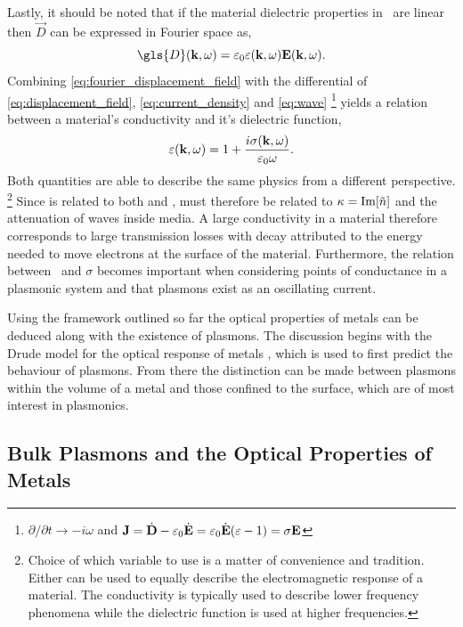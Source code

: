 \documentclass{article}
\begin{document}
Lastly, it should be noted that if the material dielectric properties in \eps\ are linear then $\vec{D}$ can be expressed in Fourier space as,%
\begin{equation}
	\gls{D}(\wv, \omega) = \epsfs\eps(\wv, \omega)\vec{E}(\wv, \omega).
	\label{eq:fourier_displacement_field}
\end{equation}
Combining \eqref{eq:fourier_displacement_field} with the differential of \eqref{eq:displacement_field}, \eqref{eq:current_density} and \eqref{eq:wave}%
\footnote{$\partial/\partial t \rightarrow -i\omega$ and $\mathbf{J}=\dot{\mathbf{D}}-\varepsilon_0\dot{\mathbf{E}}=\varepsilon_0\dot{\mathbf{E}}(\varepsilon-1)=\sigma\mathbf{E}$}
yields a relation between a material's conductivity and it's dielectric function,
\begin{equation}
	\varepsilon(\mathbf{k}, \omega) = 1 + \frac{i\sigma(\mathbf{k}, \omega)}{\varepsilon_0\omega}.
	\label{eq:dielectric_conductivity}
\end{equation}
Both quantities are able to describe the same physics from a different perspective.%
\footnote{Choice of which variable to use is a matter of convenience and tradition. Either can be used to equally describe the electromagnetic response of a material. The conductivity is typically used to describe lower frequency phenomena while the dielectric function is used at higher frequencies.}
Since \real{\eps} is related to both \imag{\sigma} and , \real{\sigma} must therefore be related to $\kappa=\mathrm{Im}\!\left[{\tilde{n}}\right]$ and the attenuation of waves inside media. A large conductivity in a material therefore corresponds to large transmission losses with decay attributed to the energy needed to move electrons at the surface of the material. Furthermore, the relation between \dielectric\ and $\sigma$ becomes important when considering points of conductance in a plasmonic system and that plasmons exist as an oscillating current.

Using the framework outlined so far the optical properties of metals can be deduced along with the existence of plasmons. The discussion begins with the Drude model for the optical response of metals \cite{drude1900}, which is used to first predict the behaviour of plasmons. From there the distinction can be made between plasmons within the volume of a metal and those confined to the surface, which are of most interest in plasmonics.

\subsection{Bulk Plasmons and the Optical Properties of Metals}
\end{document}
